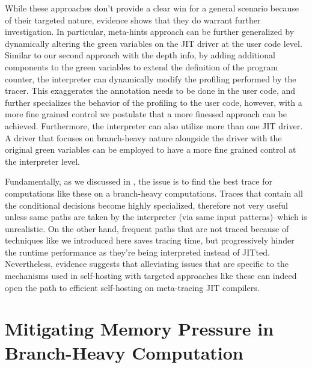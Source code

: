     \begin{paragraph-here}%
      While these approaches don't provide a clear win for a general scenario because of their targeted nature, evidence shows that they do warrant further investigation. In particular, meta-hints approach can be further generalized by dynamically altering the green variables on the JIT driver at the user code level. Similar to our second approach with the depth info, by adding additional components to the green variables to extend the definition of the program counter, the interpreter can dynamically modify the profiling performed by the tracer. This exaggerates the annotation needs to be done in the user code, and further specializes the behavior of the profiling to the user code, however, with a more fine grained control we postulate that a more finessed approach can be achieved. Furthermore, the interpreter can also utilize more than one JIT driver. A driver that focuses on branch-heavy nature alongside the driver with the original green variables can be employed to have a more fine grained control at the interpreter level.
    \end{paragraph-here}

    \begin{paragraph-here}%
      Fundamentally, as we discussed in , the issue is to find the best trace for computations like these on a branch-heavy computations. Traces that contain all the conditional decisions become highly specialized, therefore not very useful unless same paths are taken by the interpreter (via same input patterns)--which is unrealistic. On the other hand, frequent paths that are not traced because of techniques like we introduced here saves tracing time, but progressively hinder the runtime performance as they're being interpreted instead of JITted. Nevertheless, evidence suggests that alleviating issues that are specific to the mechanisms used in self-hosting with targeted approaches like these can indeed open the path to efficient self-hosting on meta-tracing JIT compilers.
    \end{paragraph-here}


	\section[\texorpdfstring{Mitigating Memory Pressure in Branch-Heavy Computation}{CEK + Stackful Model}]{Mitigating Memory Pressure in Branch-Heavy Computation}
    \label{section:stackful}

